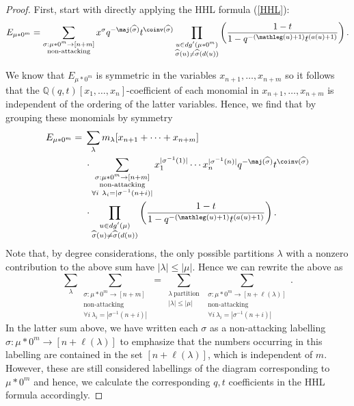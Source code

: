  \begin{proof}
 First, start with directly applying the HHL formula (\ref{HHL}):
  $$ E_{\mu * 0^m} = \sum_{\substack{\sigma: \mu * 0^m \rightarrow [n + m]\\ \text{non-attacking}}} x^{\sigma}q^{-\maj(\widehat{\sigma})}t^{\coinv(\widehat{\sigma})} \prod_{\substack{u \in dg'(\mu * 0^m) \\ \widehat{\sigma}(u) \neq \widehat{\sigma}(d(u))}} \left( \frac{1-t}{1-q^{-(\mathleg(u)+1)}t^{(a(u)+1)}} \right) .$$
  
  We know that $E_{\mu * 0^m}$ is symmetric in the variables $x_{n+1},\ldots,x_{n+m}$ \cite{C_2003} so it follows that the $\mathbb{Q}(q,t)[x_1,\ldots,x_n]$-coefficient of each monomial in $x_{n+1},\ldots,x_{n+m}$ is independent of the ordering of the latter variables. Hence, we find that by grouping these monomials by symmetry 
\begin{align*}
    E_{\mu * 0^m} = {} & {} \sum_{\lambda} m_{\lambda}[x_{n+1}+\cdots+x_{n+m}]  \\ 
    & \cdot \sum_{\substack{\sigma: \mu * 0^m \rightarrow [n + m] \\ \text{non-attacking} \\ \forall i ~ \lambda_i = |\sigma^{-1}(n+i)|  }} x_1 ^{|\sigma^{-1}(1)|}\cdots x_n ^{|\sigma^{-1}(n)|} q^{-\maj(\widehat{\sigma})}t^{\coinv(\widehat{\sigma})} \\
    & \cdot \prod_{\substack{u \in dg'(\mu) \\ \widehat{\sigma}(u) \neq \widehat{\sigma}(d(u))}} \left( \frac{1-t}{1-q^{-(\mathleg(u)+1)}t^{(a(u)+1)}} \right).
\end{align*}
 Note that, by degree considerations, the only possible partitions $\lambda$ with a nonzero contribution to the above sum have $|\lambda| \leq |\mu|$. Hence we can rewrite the above as 
  $$ \sum_{\lambda} \sum_{\substack{\sigma: \mu * 0^m \rightarrow [n + m] \\ \text{non-attacking} \\ \forall i ~ \lambda_i = |\sigma^{-1}(n+i)|  }} = \sum_{\substack{\lambda ~ \text{partition}  \\ |\lambda| \leq |\mu|}} \sum_{\substack{\sigma:\mu* 0^m \rightarrow [n+\ell(\lambda)]\\ \text{non-attacking} \\ \forall i ~ \lambda_i = |\sigma^{-1}(n+i)|}}    .$$
In the latter sum above, we have written each $\sigma$ as a non-attacking labelling $\sigma: \mu*0^m \rightarrow [n+\ell(\lambda)]$ to emphasize that the numbers occurring in this labelling are contained in the set $[n+\ell(\lambda)]$, which is independent of $m$. However, these are still considered labellings of the diagram corresponding to $\mu*0^m$ and hence, we calculate the corresponding $q,t$ coefficients in the HHL formula accordingly.
  

\end{proof}
